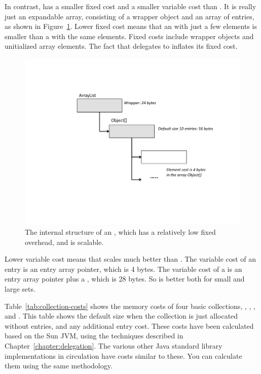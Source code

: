 In contrast,  has a smaller fixed cost and a smaller
variable cost than . It is really just an expandable array,
consisting of a wrapper object and an array of entries, as shown in Figure~\ref{fig:arraylist}. 
Lower fixed cost means that an  with just a few
 elements is smaller than a  with the same elements. Fixed costs
 include wrapper objects and unitialized array elements. The fact that 
 delegates to  inflates its fixed cost. 
 \begin{figure}
  \centering
 \includegraphics[width=.80\textwidth]{part1/Figures/collections/arraylist.pdf}
  \caption{The internal structure of an , which has a
  relatively low fixed overhead, and is scalable.}
  \label{fig:arraylist}
\end{figure}
 Lower variable cost means that
  scales much better than . The variable cost
 of an  entry is an entry array pointer, which is 4 bytes.
 The variable cost of a  is an entry array pointer plus a
 , which is 28 bytes. So   is better
 both for small and large sets.

Table~\ref{tab:collection-costs} shows the memory costs of four basic
collections, , , , and .
This table shows the default size when the collection is just allocated without
entries, and any additional entry cost. These costs have
been calculated based on the Sun JVM, using the techniques described in Chapter~\ref{chapter:delegation}. 
The various other Java standard
library implementations in circulation have costs
similar to these. You can calculate them using the same methodology.



